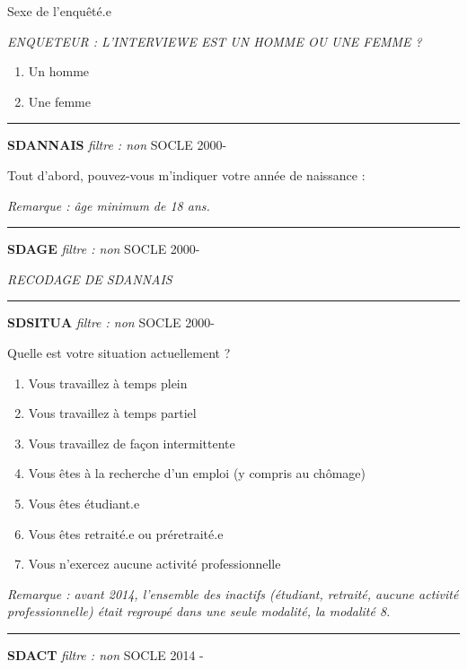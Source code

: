 \documentclass[12pt,a4paper]{reedthesis}
\providecommand{\tightlist}{%
  \setlength{\itemsep}{0pt}\setlength{\parskip}{0pt}}
\begin{document}
Sexe de l'enquêté.e

\emph{ENQUETEUR : L'INTERVIEWE EST UN HOMME OU UNE FEMME ?}
\begin{enumerate}
\def\labelenumi{\arabic{enumi}.}
\tightlist
\item
  Un homme
\item
  Une femme
\end{enumerate}
\begin{center}\rule{0.5\linewidth}{0.5pt}\end{center}

\textbf{SDANNAIS} \emph{filtre : non} SOCLE 2000-

Tout d'abord, pouvez-vous m'indiquer votre année de naissance :

\emph{Remarque : âge minimum de 18 ans.}
\begin{center}\rule{0.5\linewidth}{0.5pt}\end{center}

\textbf{SDAGE} \emph{filtre : non} SOCLE 2000-

\emph{RECODAGE DE SDANNAIS}
\begin{center}\rule{0.5\linewidth}{0.5pt}\end{center}

\textbf{SDSITUA} \emph{filtre : non} SOCLE 2000-

Quelle est votre situation actuellement ?
\begin{enumerate}
\def\labelenumi{\arabic{enumi}.}
\tightlist
\item
  Vous travaillez à temps plein
\item
  Vous travaillez à temps partiel
\item
  Vous travaillez de façon intermittente
\item
  Vous êtes à la recherche d'un emploi (y compris au chômage)
\item
  Vous êtes étudiant.e
\item
  Vous êtes retraité.e ou préretraité.e
\item
  Vous n'exercez aucune activité professionnelle
\end{enumerate}
\emph{Remarque : avant 2014, l'ensemble des inactifs (étudiant, retraité, aucune activité professionnelle) était regroupé dans une seule modalité, la modalité 8.}
\begin{center}\rule{0.5\linewidth}{0.5pt}\end{center}

\textbf{SDACT} \emph{filtre : non} SOCLE 2014 -
\end{document}
